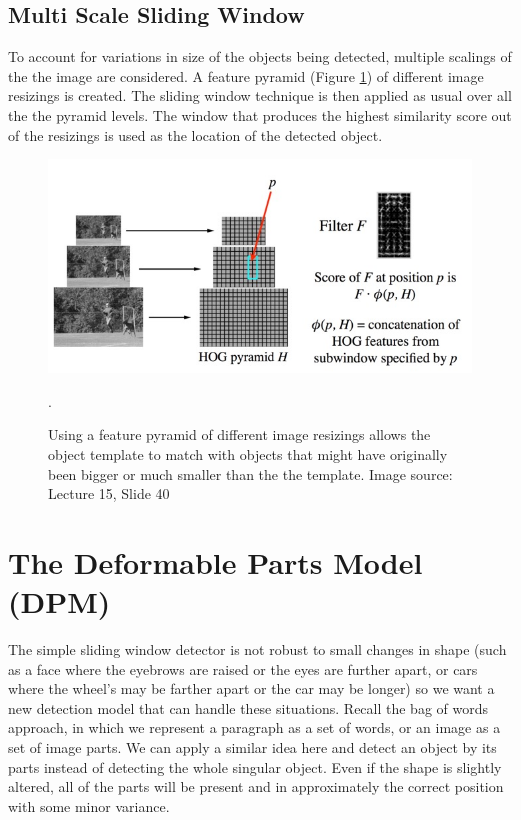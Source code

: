 \documentclass{article}
\begin{document}
\subsection{Multi Scale Sliding Window}
To account for variations in size of the objects being detected, multiple scalings of the the image are considered. A feature pyramid (Figure \ref{fig:feature_pyramid}) of different image resizings is created. The sliding window technique is then applied as usual over all the the pyramid levels. The window that produces the highest similarity score out of the resizings is used as the location of the detected object.

\begin{figure}[h]
	\includegraphics[width=\linewidth]{feature_pyramid.jpg}
	\caption{Using a feature pyramid of different image resizings allows the object template to match with objects that might have originally been bigger or much smaller than the the template. Image source: Lecture 15, Slide 40}.
    \label{fig:feature_pyramid}
\end{figure}

\section{The Deformable Parts Model (DPM)}
The simple sliding window detector is not robust to small changes in shape
(such as a face where the eyebrows are raised or the eyes are further apart, or cars
where the wheel's may be farther apart or the car may be longer) so we
want a new detection model that can handle these situations. Recall the
bag of words approach, in which we represent a paragraph as a set of words, or
an image as a set of image parts. We can apply a similar idea here and detect an
object by its parts instead of detecting the whole singular object. 
Even if the shape is
slightly altered, all of the parts will be present and in approximately the correct
position with some minor variance.\\
\end{document}
